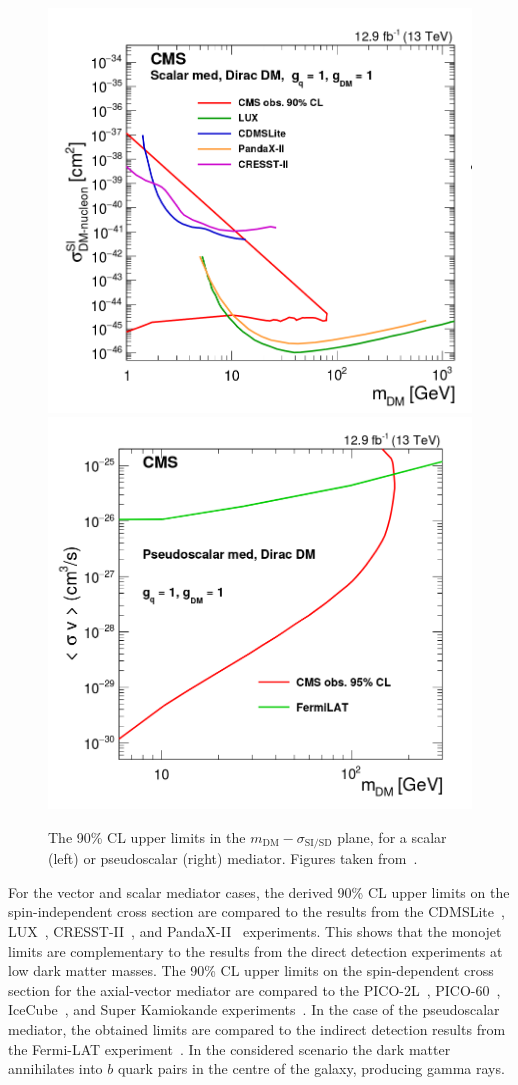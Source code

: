 \begin{figure}[ht]
  \centering
 \includegraphics[width=.49\textwidth]{scalar_DD.png} 
 \includegraphics[width=.49\textwidth]{pseudoscalar_DD.png} 
 \caption{The 90\% CL upper limits in the  $m_{\mathrm{DM}}-\sigma_{\mathrm{SI/SD}}$ plane, for a scalar (left) or pseudoscalar (right) mediator. Figures taken from~\cite{Sirunyan:2017hci}.}
 \label{fig:DDlimits_2}
\end{figure}

For the vector and scalar mediator cases, the derived 90\% CL upper limits on the spin-independent cross section are compared to the results from the CDMSLite~\cite{Agnese:2015nto}, LUX~\cite{Akerib:2015rjg}, CRESST-II~\cite{Angloher:2015ewa}, and PandaX-II~\cite{Tan:2016zwf} experiments. This shows that the monojet limits are complementary to the results from the direct detection experiments at low dark matter masses. The 90\% CL upper limits on the spin-dependent cross section for the axial-vector mediator are compared to the PICO-2L~\cite{Amole:2016pye}, PICO-60~\cite{Amole:2015pla}, IceCube~\cite{Aartsen:2016exj}, and Super Kamiokande experiments~\cite{Choi:2015ara}. In the case of the pseudoscalar mediator, the obtained limits are compared to the indirect detection results from the Fermi-LAT experiment~\cite{Ackermann:2011wa,Abdo:2010ex}. In the considered scenario the dark matter annihilates into $b$ quark pairs in the centre of the galaxy, producing gamma rays.

